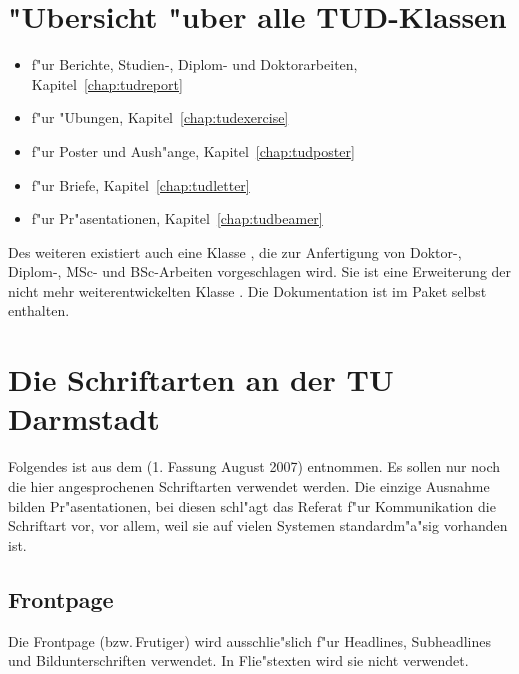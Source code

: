 \documentclass[twoside,colorback,accentcolor=tud4c,11pt]{tudreport}
\begin{document}
  \section{"Ubersicht "uber alle TUD-Klassen}

  \begin{itemize}\itemsep-0.5ex
    \item {} f"ur Berichte, Studien-, Diplom- und Doktorarbeiten,
    Kapitel~\ref{chap:tudreport}
    \item {} f"ur "Ubungen, Kapitel~\ref{chap:tudexercise}
    \item {} f"ur Poster und Aush"ange, Kapitel~\ref{chap:tudposter}
    \item {} f"ur Briefe, Kapitel~\ref{chap:tudletter}
    \item {} f"ur Pr"asentationen, Kapitel~\ref{chap:tudbeamer}
  \end{itemize}

  Des weiteren existiert auch eine Klasse , die zur
  Anfertigung von Doktor-, Diplom-, MSc- und  BSc-Arbeiten vorgeschlagen
  wird. Sie ist eine Erweiterung der nicht mehr weiterentwickelten Klasse
  . Die Dokumentation ist im Paket selbst enthalten.

  \section{Die Schriftarten an der TU Darmstadt}

    Folgendes ist aus dem  (1. Fassung August 2007)
    entnommen. Es sollen nur noch die hier angesprochenen Schriftarten verwendet
    werden. Die einzige Ausnahme bilden Pr"asentationen, bei diesen schl"agt
    das Referat f"ur Kommunikation die Schriftart  vor,
    vor allem, weil sie auf vielen Systemen standardm"a"sig vorhanden ist.
 
  \subsection{Frontpage}
    Die Frontpage (bzw.\,Frutiger) wird ausschlie"slich f"ur Headlines, Subheadlines und Bildunterschriften
    verwendet. In Flie"stexten wird sie nicht verwendet.
\end{document}
